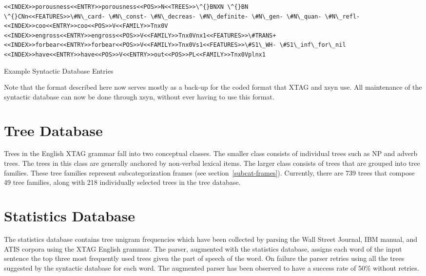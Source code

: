 {\begin{table}[htb]
\begin{verbatim}
<<INDEX>>porousness<<ENTRY>>porousness<<POS>>N<<TREES>>\^{}BNXN \^{}BN
\^{}CNn<<FEATURES>>\#N\_card- \#N\_const- \#N\_decreas- \#N\_definite- \#N\_gen- \#N\_quan- \#N\_refl-
<<INDEX>>coo<<ENTRY>>coo<<POS>>V<<FAMILY>>Tnx0V
<<INDEX>>engross<<ENTRY>>engross<<POS>>V<<FAMILY>>Tnx0Vnx1<<FEATURES>>\#TRANS+
<<INDEX>>forbear<<ENTRY>>forbear<<POS>>V<<FAMILY>>Tnx0Vs1<<FEATURES>>\#S1\_WH- \#S1\_inf\_for\_nil
<<INDEX>>have<<ENTRY>>have<<POS>>V<<ENTRY>>out<<POS>>PL<<FAMILY>>Tnx0Vplnx1
\end{verbatim}   
\caption{Example Syntactic Database Entries}

\label{syn-entries}
\end{table}

Note that the format described here now serves mostly as a back-up for
the coded format that XTAG and xsyn use. All maintenance of the syntactic 
database can now be done through xsyn, without ever having to use this
format.  

\section{Tree Database} 
\label{tree-db}

Trees in the English XTAG grammar fall into two conceptual classes.
The smaller class consists of individual trees such as NP and adverb
trees.  The trees in this class are generally anchored by non-verbal
lexical items. The larger class consists of trees that are grouped
into tree families.  These tree families represent subcategorization
frames (see section~\ref{subcat-frames}).  Currently, there are 739
trees that compose 49 tree families, along with 218 individually
selected trees in the tree database.


\section{Statistics Database}
\label{stat-db}
The statistics database contains tree unigram frequencies which have been
collected by parsing the Wall Street Journal, IBM manual, and ATIS corpora
using the XTAG English grammar. The parser, augmented with the statistics
database, assigns each word of the input sentence the top three most frequently
used trees given the part of speech of the word. On failure the parser retries
using all the trees suggested by the syntactic database for each word.  The
augmented parser has been observed to have a success rate of 50\% without
retries.

}
